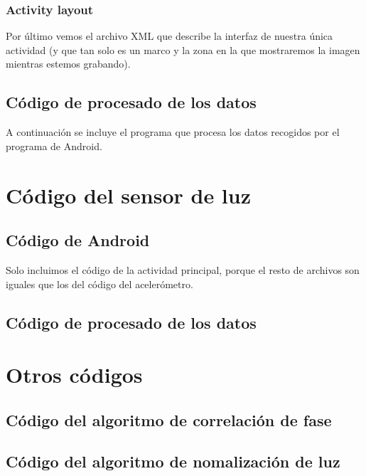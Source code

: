 \documentclass[a4paper,openright, 12pt]{book}
\begin{document}
\subsection{Activity layout}
Por último vemos el archivo XML que describe la interfaz de nuestra única actividad (y que tan solo es un marco y la zona en la que mostraremos la imagen mientras estemos grabando).


\newpage
\section{Código de procesado de los datos} \label{ap_acc}
A continuación se incluye el programa que procesa los datos recogidos por el programa de Android.

\newpage


\chapter{Código del sensor de luz} 
\section{Código de Android} \label{android_ap_illu}
Solo incluimos el código de la actividad principal, porque el resto de archivos son iguales que los del código del acelerómetro.

\newpage
\section{Código de procesado de los datos} \label{ap_illu}

\newpage
\chapter{Otros códigos} 
\section{Código del algoritmo de correlación de fase} \label{ap_pc}

\section{Código del algoritmo de nomalización de luz} \label{ap_luz}

\cleardoublepage
{}
\nocite{*}
\end{document}
